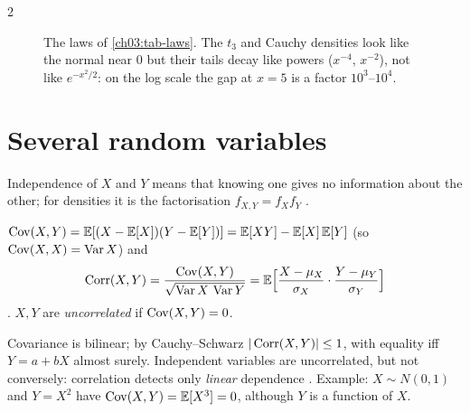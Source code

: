\begin{paracol}{2}
\begin{figure}[!htb]
\hfill
{}
\caption{The laws of \cref{ch03:tab-laws}. The $t_3$ and Cauchy densities look like the normal near $0$ but
their tails decay like powers ($x^{-4}$, $x^{-2}$), not like $e^{-x^2/2}$: on the log scale the gap at $x=5$ is a
factor $10^3$--$10^4$.}\label{ch03:fig-laws}
\end{figure}

\section{Several random variables}\label{ch03:sec-multi}

Independence of $X$ and $Y$ means that knowing one gives no information about the other; for densities
it is the factorisation $f_{X,Y}=f_Xf_Y$ .

\begin{definition}
$\operatorname{Cov}(X,Y)=\mathbb{E}[(X-\mathbb{E}[X])(Y-\mathbb{E}[Y])]=\mathbb{E}[XY]-\mathbb{E}[X]\,\mathbb{E}[Y]$ (so $\operatorname{Cov}(X,X)=\operatorname{Var} X$) and
\[
  \operatorname{Corr}(X,Y)=\frac{\operatorname{Cov}(X,Y)}{\sqrt{\operatorname{Var} X\,\operatorname{Var} Y}}=\mathbb{E}\Bigl[\frac{X-\mu_X}{\sigma_X}\cdot\frac{Y-\mu_Y}{\sigma_Y}\Bigr]
\]
. $X,Y$ are \emph{uncorrelated} if $\operatorname{Cov}(X,Y)=0$.
\end{definition}
Covariance is bilinear; by Cauchy--Schwarz $|\operatorname{Corr}(X,Y)|\le1$, with equality iff $Y=a+bX$ almost surely.
Independent variables are uncorrelated, but not conversely: correlation detects only \emph{linear}
dependence . Example: $X\sim N(0,1)$ and $Y=X^2$ have $\operatorname{Cov}(X,Y)=\mathbb{E}[X^3]=0$, although $Y$ is a
function of $X$.


\end{paracol}
